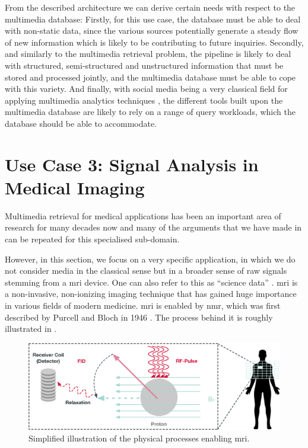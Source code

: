 From the described architecture we can derive certain needs with respect to the multimedia database: Firstly, for this use case, the database must be able to deal with non-static data, since the various sources potentially generate a steady flow of new information which is likely to be contributing to future inquiries. Secondly, and similarly to the multimedia retrieval problem, the pipeline is likely to deal with structured, semi-structured and unstructured information that must be stored and processed jointly, and the multimedia database must be able to cope with this variety. And finally, with social media being a very classical field for applying multimedia analytics techniques \cite{Pouyanfar:2018,Jonsson:2016Ten}, the different tools built upon the multimedia database are likely to rely on a range of query workloads, which the database should be able to accommodate.

\section{Use Case 3: Signal Analysis in Medical Imaging}
\label{section:application_mrf}

Multimedia retrieval for medical applications has been an important area of research for many decades now \cite{Mueller:2017Retrieval,Mueller:2004Review} and many of the arguments that we have made in  can be repeated for this specialised sub-domain.

However, in this section, we focus on a very specific application, in which we do not consider media in the classical sense but in a broader sense of raw signals stemming from a \acrfull{mri} device. One can also refer to this as ``science data'' \cite{Stonebraker:2013SciDB}. \acrshort{mri} is a non-invasive, non-ionizing imaging technique that has gained huge importance in various fields of modern medicine. \acrshort{mri} is enabled by \acrfull{nmr}, which was first described by Purcell and Bloch in 1946 \cite{Bloch:1946Nuclear,Purcell:1946Resonance}. The process behind it is roughly illustrated in .

\begin{figure}[b]
    \centering
    \includegraphics[width=\textwidth]{figures/mri.eps}
    \caption{Simplified illustration of the physical processes enabling \acrshort{mri}.}
    \label{figure:mri}
\end{figure}

